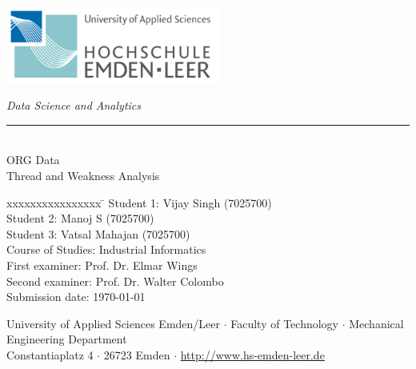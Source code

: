 %
%

\begin{titlepage}
    
    \begin{flushleft} 
        \includegraphics[width=7cm]{General/Logo.png}
    \end{flushleft} 
    
    \begin{flushright}
        \vspace{2cm}
        \LARGE \textsl{Data Science and Analytics}\\
        \rule{0.6\textwidth}{0.4pt} ~\\
        \vspace{0.5cm}
        \textsf{\LARGE ORG Data}\\
        \textsf{\LARGE Thread and Weakness Analysis}
    \end{flushright}
    
    \vspace{2cm}
    \large
    \begin{tabbing}
        xxxxxxxxxxxxxxxx \= \kill
        Student 1: \> Vijay Singh (7025700)\\
        Student 2: \> Manoj S (7025700) \\
        Student 3: \> Vatsal Mahajan (7025700)\\
        Course of Studies: \> Industrial Informatics \\ [0.5cm]
        First examiner: \> Prof. Dr. Elmar Wings \\
        Second examiner: \> Prof. Dr. Walter Colombo \\ [0.5cm]
        Submission date: \> \today \\
    \end{tabbing}
    
    \vspace{3cm}
    \small
    \begin{center}
        University of Applied Sciences Emden/Leer $\cdot$ 
        Faculty of Technology $\cdot$ 
        Mechanical Engineering Department \\
        Constantiaplatz 4 $\cdot$ 
        26723 Emden $\cdot$ 
        \url{http://www.hs-emden-leer.de}
    \end{center}
    
\end{titlepage}
